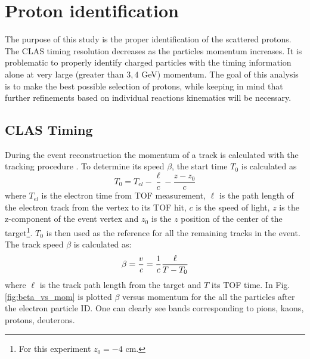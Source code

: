 \section{Proton identification}

The purpose of this study is the proper identification of the
scattered protons. The CLAS timing resolution decreases as the
particles momentum increases. It is problematic to properly identify
charged particles with the timing  information alone at very large (greater than $3, 4$ GeV) momentum.
The goal of this analysis is to make the best possible selection of protons, while keeping
in mind that further refinements based on individual reactions kinematics will be necessary.


\subsection{CLAS Timing}
\label{sec:clas_timing}


During the event reconstruction the momentum of a track is calculated 
with the tracking procedure \cite{bib:tracking}. To determine its speed $\beta$,
the start time $T_0$ is calculated as
\begin{equation}
 T_0 = T_{el} - \frac{\ell}{c} - \frac{z-z_0}{c}
\end{equation}
where $T_{el}$ is the electron time from TOF measurement, $\ell$ is the
path length of the electron track from the vertex to its TOF hit, $c$ is
the speed of light, $z$ is the z-component of the event vertex and $z_0$ 
is the $z$ position of the center of the 
target\footnote{For this experiment $z_0 = -4$ cm.}. $T_0$ is then used 
as the reference for all the remaining tracks in the event. The track speed $\beta$ 
is calculated as:
\begin{equation}
 \beta = \frac{v}{\it c} = \frac{1}{c} \frac{\ell}{T-T_0}
\end{equation}
where $\ell$ is the track path length from the target and $T$ its TOF time.
In  Fig.\ref{fig:beta_vs_mom} is plotted $\beta$ versus momentum for the all the 
particles after the electron particle ID. One can clearly see bands corresponding 
to pions, kaons, protons, deuterons.


